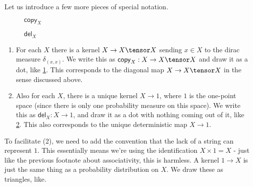 \documentclass{article}
\newcommand{\del}{\mathsf{del}}
\newcommand{\cop}{\mathsf{copy}}
\begin{document}
Let us introduce a few more pieces of special notation.
\begin{figure}
\begin{center}

\end{center}
\caption{$\cop_X$}

\label{fig:copy}
\end{figure}

\begin{figure}
\begin{center}

\end{center}
\caption{$\del_X$}

\label{fig:delete}
\end{figure}

\begin{enumerate}
    \item For each $X$ there is a kernel $X \to X \tensor X$ sending $x \in X$ to the dirac measure $\delta_{(x,x)}$.
    We write this as $\mathsf{copy}_X: X \to X \tensor X$ and draw it as a dot, like \cref{fig:copy}. This corresponds to the diagonal map $X \to X \tensor X$ in the sense discussed above.
    \item Also for each $X$, there is a unique kernel $X \to 1$, where $1$ is the one-point space (since there is only one probability measure on this space).
    We write this as $\mathsf{del}_X: X \to 1$, and draw it as a dot with nothing coming out of it, like \cref{fig:delete}. This also corresponds to the unique deterministic map $X \to 1$.
\end{enumerate}

To facilitate (2), we need to add the convention that the lack of a string can represent $1$.
This essentially means we're using the identification $X \times 1 = X$ - just like the previous footnote about associativity, this is harmless.
A kernel $1 \to X$ is just the same thing as a probability distribution on $X$. We draw these as triangles, like.
\end{document}
